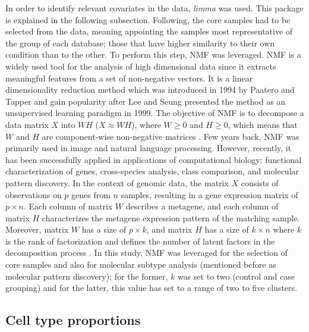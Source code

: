 In order to identify relevant covariates in the data, \textit{limma} was used. This package is explained in the following subsection. Following, the core samples had to be selected from the data, meaning appointing the samples most representative of the group of each database; those that have higher similarity to their own condition than to the other. To perform this step, NMF was leveraged. NMF is a widely used tool for the analysis of high dimensional data since it extracts meaningful features from a set of non-negative vectors. It is a linear dimensionality reduction method which was introduced in 1994 by Paatero and Tapper \cite{paatero} and gain popularity after Lee and Seung \cite{lee} presented the method as an unsupervised learning paradigm in 1999. The objective of NMF is to decompose a data matrix $X$ into $WH$ ($X \approx WH$), where $W \geq 0$ and $H \geq 0$, which means that $W$ and $H$ are component-wise non-negative matrices \cite{gillis}. Few years back, NMF was primarily used in image and natural language processing. However, recently, it has been successfully applied in applications of computational biology: functional characterization of genes, cross-species analysis, class comparison, and molecular pattern discovery. In the context of genomic data, the matrix $X$ consists of observations on $p$ genes from $n$ samples, resulting in a gene expression matrix of $p \times n$. Each column of matrix $W$ describes a metagene, and each column of matrix $H$ characterizes the metagene expression pattern of the matching sample. Moreover, matrix $W$ has a size of $p \times k$, and matrix $H$ has a size of $k \times n$ where $k$ is the rank of factorization and defines the number of latent factors in the decomposition process \cite{nmf}. In this study, NMF was leveraged for the selection of core samples and also for molecular subtype analysis (mentioned before as molecular pattern discovery); for the former, $k$ was set to two (control and case grouping) and for the latter, this value has set to a range of two to five clusters.

\subsection{Cell type proportions} \label{cellprop}

